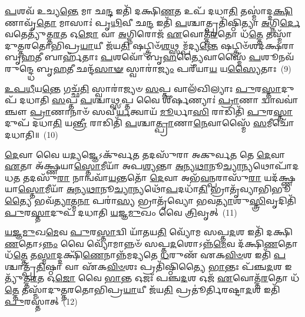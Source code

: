 \-\ul{𑌪}\-𑌶𑌵᳴ 𑌉𑌚𑍍𑌯\-\ul{𑌨𑍍𑌤𑍇} 𑌮𑌾 𑌛\-\ul{𑌨𑍍𑌦} 𑌇𑌤𑌿᳴ 𑌦𑌕𑍍𑌷𑌿\-\ul{𑌣}\-𑌤 𑌉𑌪᳴ 𑌦𑌧𑌾\-\ul{𑌤𑌿} 𑌤𑌸𑍍𑌮𑌾॑𑌦𑍍𑌦\-\ul{𑌕𑍍𑌷𑌿}\-𑌣𑌾𑌵𑍃᳴\-\ul{𑌤𑍋} 𑌮𑌾𑌸𑌾𑌃॑ 𑌪𑍃\-\ul{𑌥𑌿}\-𑌵𑍀 𑌛\-\ul{𑌨𑍍𑌦} 𑌇𑌤𑌿᳴ \ul{𑌪}\-𑌶𑍍𑌚𑌾𑌤𑍍𑌪𑍍𑌰𑌤𑌿᳴𑌷𑍍𑌠𑌿𑌤𑍍𑌯𑌾 \ul{𑌅}\-𑌗𑍍𑌨𑌿\-\ul{𑌰𑍍𑌦𑍇}\-𑌵𑌤𑍇𑌤𑍍𑌯𑍁᳴𑌤𑍍𑌤\-\ul{𑌰}\-𑌤 𑌓\-\ul{𑌜𑍋} 𑌵𑌾 \ul{𑌅}\-𑌗𑍍𑌨𑌿𑌰𑍋𑌜᳴ \ul{𑌏}\-𑌵𑍋𑌤𑍍𑌤᳴\-\ul{𑌰}\-𑌤𑍋 𑌧᳴\-\ul{𑌤𑍍𑌤𑍇} 𑌤𑌸𑍍𑌮𑌾᳴𑌦𑍁𑌤𑍍𑌤𑌰𑌤𑍋𑌭𑌿𑌪𑍍𑌰\-\ul{𑌯𑌾}\-𑌯𑍀 𑌜᳴𑌯\-\ul{𑌤𑌿} 𑌷𑌟𑍍𑌤𑍍𑌰𑌿𑍞᳴\-\ul{𑌶}\-𑌥𑍍𑌸𑌮𑍍𑌪᳴𑌦𑍍𑌯\-\ul{𑌨𑍍𑌤𑍇} 𑌷𑌟𑍍𑌤𑍍𑌰𑌿𑍞᳴𑌶𑌦𑌕𑍍𑌷𑌰𑌾 𑌬𑍃\-\ul{𑌹}\-𑌤𑍀 𑌬𑌾𑌰𑍍\mbox{}𑌹᳴𑌤𑌾𑌃 \ul{𑌪}\-𑌶𑌵𑍋᳴ 𑌬𑍃\-\ul{𑌹}\-𑌤𑍍𑌯𑍈𑌵𑌾𑌸𑍍𑌮𑍈᳴ \ul{𑌪}\-𑌶𑍂𑌨𑌵᳴ 𑌰𑍁𑌨𑍍𑌦𑍍𑌧𑍇 𑌬𑍃\-\ul{𑌹}\-𑌤𑍀 𑌛𑌨𑍍𑌦᳴\-\ul{𑌸𑌾}\-\-\ul{𑍟} 𑌸𑍍𑌵𑌾𑌰𑌾॑\-\ul{𑌜𑍍𑌯𑌂} 𑌪𑌰𑍀᳴𑌯𑌾\-\ul{𑌯} 𑌯\-\ul{𑌸𑍍𑌯𑍈}\-𑌤𑌾𑌃~(9)

\-\ul{𑌉}\-\-\ul{𑌪}\-\-\ul{𑌧𑍀}\-𑌯\-\ul{𑌨𑍍𑌤𑍇} 𑌗𑌚𑍍𑌛᳴\-\ul{𑌤𑌿} 𑌸𑍍𑌵𑌾𑌰𑌾॑𑌜𑍍𑌯𑍞 \ul{𑌸}\-𑌪𑍍𑌤 𑌵𑌾𑌲᳴𑌖𑌿𑌲𑍍𑌯𑌾𑌃 \ul{𑌪𑍁}\-𑌰\-\ul{𑌸𑍍𑌤𑌾}\-𑌦𑍁𑌪᳴ 𑌦𑌧𑌾𑌤𑌿 \ul{𑌸}\-𑌪𑍍𑌤 \ul{𑌪}\-𑌶𑍍𑌚𑌾\-\ul{𑌥𑍍𑌸}\-𑌪𑍍𑌤 𑌵𑍈 𑌶𑍀᳴𑌰𑍍\mbox{}\-\ul{𑌷}\-𑌣𑍍𑌯𑌾𑌃॑ \ul{𑌪𑍍𑌰𑌾}\-𑌣𑌾 𑌦𑍍𑌵𑌾𑌵𑌵𑌾॑𑌞𑍍𑌚𑍗 \ul{𑌪𑍍𑌰𑌾}\-𑌣𑌾𑌨𑌾𑍞᳴ 𑌸𑌵𑍀\-\ul{𑌰𑍍𑌯}\-𑌤𑍍𑌵𑌾𑌯᳴ \ul{𑌮𑍂}\-𑌰𑍍𑌧𑌾\-\ul{𑌸𑌿} 𑌰𑌾𑌡𑌿𑌤𑌿᳴ \ul{𑌪𑍁}\-𑌰\-\ul{𑌸𑍍𑌤𑌾}\-𑌦𑍁𑌪᳴ 𑌦𑌧𑌾\-\ul{𑌤𑌿} 𑌯\-\ul{𑌨𑍍𑌤𑍍𑌰𑍀} 𑌰𑌾𑌡𑌿𑌤𑌿᳴ \ul{𑌪}\-𑌶𑍍𑌚𑌾\-\ul{𑌤𑍍𑌪𑍍𑌰𑌾}\-𑌣𑌾\-\ul{𑌨𑍇}\-𑌵𑌾𑌸𑍍𑌮𑍈᳴ \ul{𑌸}\-𑌮𑍀𑌚𑍋᳴ 𑌦𑌧𑌾𑌤𑌿॥~(10)

{}%

\-\ul{𑌦𑍇}\-𑌵𑌾 𑌵𑍈 𑌯\-\ul{𑌦𑍍𑌯}\-𑌜𑍍𑌞𑍇\-𑌽𑌕𑍁᳴𑌰𑍍𑌵\-\ul{𑌤} 𑌤𑌦𑌸𑍁᳴𑌰𑌾 𑌅𑌕𑍁𑌰𑍍𑌵\-\ul{𑌤} 𑌤𑍇 \ul{𑌦𑍇}\-𑌵𑌾 \ul{𑌏}\-𑌤𑌾 𑌅᳴𑌕𑍍𑌷𑍍𑌣𑌯𑌾\-\ul{𑌸𑍍𑌤𑍋}\-𑌮𑍀𑌯𑌾᳴ 𑌅𑌪\-\ul{𑌶𑍍𑌯}\-𑌨𑍍𑌤𑌾 \ul{𑌅}\-𑌨𑍍𑌯\-\ul{𑌥𑌾}\-𑌨𑍂\-\ul{𑌚𑍍𑌯𑌾}\-𑌨𑍍𑌯𑌥𑍋𑌪𑌾᳴𑌦𑌧\-\ul{𑌤} 𑌤𑌦𑌸𑍁᳴\-\ul{𑌰𑌾} 𑌨𑌾𑌨𑍍𑌵𑌵𑌾᳴\-\ul{𑌯}\-𑌨𑍍𑌤𑌤𑍋᳴ \ul{𑌦𑍇}\-𑌵𑌾 𑌅𑌭᳴\-\ul{𑌵}\-𑌨𑍍𑌪𑌰𑌾𑌸𑍁᳴\-\ul{𑌰𑌾} 𑌯𑌦᳴𑌕𑍍𑌷𑍍𑌣𑌯𑌾\-\ul{𑌸𑍍𑌤𑍋}\-𑌮𑍀𑌯𑌾᳴ \ul{𑌅}\-𑌨𑍍𑌯\-\ul{𑌥𑌾}\-𑌨𑍂\-\ul{𑌚𑍍𑌯𑌾}\-𑌨𑍍𑌯𑌥𑍋᳴\-\ul{𑌪}\-𑌦𑌧𑌾᳴\-\ul{𑌤𑌿} 𑌭𑍍𑌰𑌾𑌤𑍃᳴𑌵𑍍𑌯𑌾𑌭𑌿𑌭𑍂\-\ul{𑌤𑍍𑌯𑍈} 𑌭𑌵᳴\-\ul{𑌤𑍍𑌯𑌾}\-𑌤𑍍𑌮\-\ul{𑌨𑌾} 𑌪𑌰𑌾॑\-\ul{𑌸𑍍𑌯} 𑌭𑍍𑌰𑌾𑌤𑍃᳴𑌵𑍍𑌯𑍋 𑌭𑌵\-\ul{𑌤𑍍𑌯𑌾}\-𑌶𑍁\-\ul{𑌸𑍍𑌤𑍍𑌰𑌿}\-𑌵𑍃𑌦𑌿𑌤𑌿᳴ \ul{𑌪𑍁}\-𑌰\-\ul{𑌸𑍍𑌤𑌾}\-𑌦𑍁𑌪᳴ 𑌦𑌧𑌾𑌤𑌿 \ul{𑌯}\-𑌜𑍍𑌞\-\ul{𑌮𑍁}\-𑌖𑌂 𑌵𑍈 \ul{𑌤𑍍𑌰𑌿}\-𑌵𑍃𑌤𑍍~(11)

\-\ul{𑌯}\-\-\ul{𑌜𑍍𑌞}\-\-\ul{𑌮𑍁}\-𑌖\-\ul{𑌮𑍇}\-𑌵 \ul{𑌪𑍁}\-𑌰\-\ul{𑌸𑍍𑌤𑌾}\-𑌦𑍍𑌵𑌿 𑌯𑌾᳴𑌤𑌯\-\ul{𑌤𑌿} 𑌵𑍍𑌯𑍋᳴𑌮 𑌸𑌪𑍍𑌤\-\ul{𑌦}\-𑌶 𑌇𑌤𑌿᳴ 𑌦𑌕𑍍𑌷𑌿\-\ul{𑌣}\-𑌤𑍋\-𑌽\-\ul{𑌨𑍍𑌨𑌂} 𑌵𑍈 𑌵𑍍𑌯𑍋᳴𑌮𑌾𑌨𑍍𑌨𑍞᳴ 𑌸𑌪𑍍𑌤\-\ul{𑌦}\-𑌶𑍋\-𑌽𑌨𑍍𑌨᳴\-\ul{𑌮𑍇}\-𑌵 𑌦᳴𑌕𑍍𑌷𑌿\-\ul{𑌣}\-𑌤𑍋 𑌧᳴\-\ul{𑌤𑍍𑌤𑍇} 𑌤\-\ul{𑌸𑍍𑌮𑌾}\-𑌦𑍍𑌦𑌕𑍍𑌷𑌿᳴\-\ul{𑌣𑍇}\-𑌨𑌾𑌨𑍍𑌨᳴𑌮𑌦𑍍𑌯𑌤𑍇 \ul{𑌧}\-𑌰𑍁𑌣᳴ 𑌏𑌕\-\ul{𑌵𑌿}\-\-\ul{𑍞}\-𑌶 𑌇𑌤𑌿᳴ \ul{𑌪}\-𑌶𑍍𑌚𑌾𑌤𑍍𑌪𑍍𑌰᳴\-\ul{𑌤𑌿}\-𑌷𑍍𑌠𑌾 𑌵𑌾 𑌏᳴𑌕\-\ul{𑌵𑌿}\-\-\ul{𑍞}\-𑌶𑌃 𑌪𑍍𑌰𑌤𑌿᳴𑌷𑍍𑌠𑌿𑌤𑍍𑌯𑍈 \ul{𑌭𑌾}\-𑌨𑍍𑌤𑌃 𑌪᳴𑌞𑍍𑌚\-\ul{𑌦}\-𑌶 𑌇𑌤𑍍𑌯𑍁᳴𑌤𑍍𑌤\-\ul{𑌰}\-𑌤 𑌓\-\ul{𑌜𑍋} 𑌵𑍈 \ul{𑌭𑌾}\-𑌨𑍍𑌤 𑌓𑌜𑌃᳴ 𑌪𑌞𑍍𑌚\-\ul{𑌦}\-𑌶 𑌓𑌜᳴ \ul{𑌏}\-𑌵𑍋𑌤𑍍𑌤᳴\-\ul{𑌰}\-𑌤𑍋 𑌧᳴\-\ul{𑌤𑍍𑌤𑍇} 𑌤𑌸𑍍𑌮𑌾᳴𑌦𑍁𑌤𑍍𑌤𑌰𑌤𑍋𑌭𑌿𑌪𑍍𑌰\-\ul{𑌯𑌾}\-𑌯𑍀 𑌜᳴𑌯\-\ul{𑌤𑌿} 𑌪𑍍𑌰𑌤𑍂॑𑌰𑍍𑌤𑌿𑌰𑌷𑍍𑌟𑌾\-\ul{𑌦}\-𑌶 𑌇𑌤𑌿᳴ \ul{𑌪𑍁}\-𑌰𑌸𑍍𑌤𑌾॑𑌤𑍍~(12)


